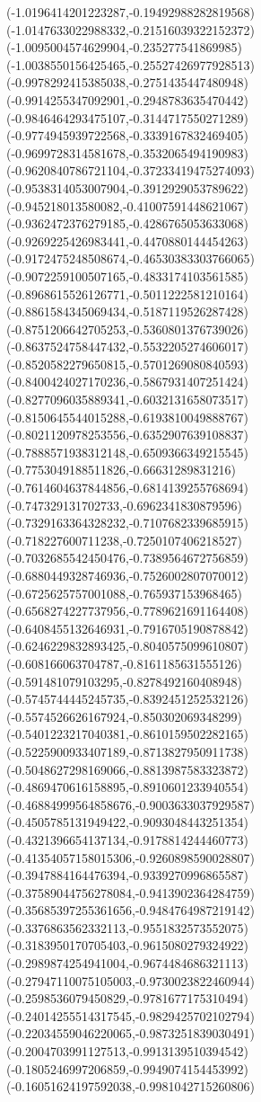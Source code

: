 {(-1.0196414201223287,-0.19492988282819568)
(-1.0147633022988332,-0.21516039322152372)
(-1.0095004574629904,-0.235277541869985)
(-1.0038550156425465,-0.25527426977928513)
(-0.9978292415385038,-0.2751435447480948)
(-0.9914255347092901,-0.2948783635470442)
(-0.9846464293475107,-0.3144717550271289)
(-0.9774945939722568,-0.3339167832469405)
(-0.9699728314581678,-0.3532065494190983)
(-0.9620840786721104,-0.37233419475274093)
(-0.9538314053007904,-0.3912929053789622)
(-0.945218013580082,-0.41007591448621067)
(-0.9362472376279185,-0.4286765053633068)
(-0.9269225426983441,-0.4470880144454263)
(-0.9172475248508674,-0.46530383303766065)
(-0.9072259100507165,-0.4833174103561585)
(-0.8968615526126771,-0.5011222581210164)
(-0.8861584345069434,-0.5187119526287428)
(-0.8751206642705253,-0.5360801376739026)
(-0.8637524758447432,-0.5532205274606017)
(-0.8520582279650815,-0.5701269080840593)
(-0.8400424027170236,-0.5867931407251424)
(-0.8277096035889341,-0.6032131658073517)
(-0.8150645544015288,-0.6193810049888767)
(-0.8021120978253556,-0.6352907639108837)
(-0.7888571938312148,-0.6509366349215545)
(-0.7753049188511826,-0.66631289831216)
(-0.7614604637844856,-0.6814139255768694)
(-0.747329131702733,-0.6962341830879596)
(-0.7329163364328232,-0.7107682339685915)
(-0.718227600711238,-0.7250107406218527)
(-0.7032685542450476,-0.7389564672756859)
(-0.6880449328746936,-0.7526002807070012)
(-0.6725625757001088,-0.765937153968465)
(-0.6568274227737956,-0.7789621691164408)
(-0.6408455132646931,-0.7916705190878842)
(-0.6246229832893425,-0.8040575099610807)
(-0.608166063704787,-0.8161185631555126)
(-0.591481079103295,-0.8278492160408948)
(-0.5745744445245735,-0.8392451252532126)
(-0.5574526626167924,-0.850302069348299)
(-0.5401223217040381,-0.8610159502282165)
(-0.5225900933407189,-0.8713827950911738)
(-0.5048627298169066,-0.8813987583323872)
(-0.4869470616158895,-0.8910601233940554)
(-0.46884999564858676,-0.9003633037929587)
(-0.4505785131949422,-0.9093048443251354)
(-0.4321396654137134,-0.9178814244460773)
(-0.41354057158015306,-0.9260898590028807)
(-0.3947884164476394,-0.9339270996865587)
(-0.37589044756278084,-0.9413902364284759)
(-0.35685397255361656,-0.9484764987219142)
(-0.3376863562332113,-0.9551832573552075)
(-0.3183950170705403,-0.9615080279324922)
(-0.2989874254941004,-0.9674484686321113)
(-0.27947110075105003,-0.9730023822460944)
(-0.2598536079450829,-0.9781677175310494)
(-0.24014255514317545,-0.9829425702102794)
(-0.22034559046220065,-0.9873251839030491)
(-0.2004703991127513,-0.9913139510394542)
(-0.1805246997206859,-0.9949074154453992)
(-0.16051624197592038,-0.9981042715260806)
}
